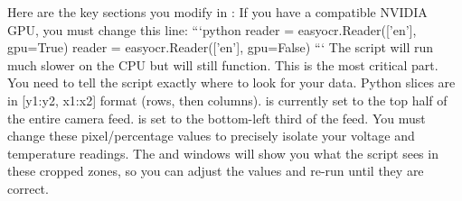{}Here are the key sections you  modify in :\markdownRendererInterblockSeparator
{}\markdownRendererSectionBegin
{}\markdownRendererInterblockSeparator
{}If you  have a compatible NVIDIA GPU, you must change this line:\markdownRendererInterblockSeparator
{}```python\markdownRendererInterblockSeparator
{}
\markdownRendererSectionEnd 
\markdownRendererSectionEnd 
\markdownRendererSectionEnd \markdownRendererSectionBegin
{}\markdownRendererInterblockSeparator
{}reader = easyocr.Reader(['en'], gpu=True)\markdownRendererInterblockSeparator
{}
\markdownRendererSectionEnd \markdownRendererSectionBegin
{}\markdownRendererInterblockSeparator
{}reader = easyocr.Reader(['en'], gpu=False) ```\markdownRendererInterblockSeparator
{}The script will run much slower on the CPU but will still function.\markdownRendererInterblockSeparator
{}\markdownRendererSectionBegin
\markdownRendererSectionBegin
{}\markdownRendererInterblockSeparator
{}This is the most critical part. You need to tell the script exactly where to look for your data.\markdownRendererInterblockSeparator
{}\markdownRendererInterblockSeparator
{}Python slices are in [y1:y2, x1:x2] format (rows, then columns).\markdownRendererInterblockSeparator
{} is currently set to the top half of the entire camera feed.\markdownRendererInterblockSeparator
{} is set to the bottom-left third of the feed.\markdownRendererInterblockSeparator
{}You must change these pixel/percentage values to precisely isolate your voltage and temperature readings. The  and  windows will show you what the script sees in these cropped zones, so you can adjust the values and re-run until they are correct.\markdownRendererInterblockSeparator
{}
\markdownRendererSectionEnd \markdownRendererSectionBegin
{}\markdownRendererInterblockSeparator
